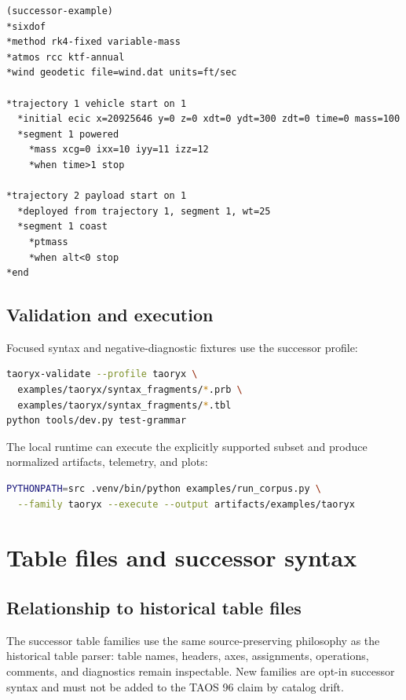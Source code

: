 \documentclass[11pt,twoside,openany]{book}
\begin{document}
\begin{lstlisting}
(successor-example)
*sixdof
*method rk4-fixed variable-mass
*atmos rcc ktf-annual
*wind geodetic file=wind.dat units=ft/sec

*trajectory 1 vehicle start on 1
  *initial ecic x=20925646 y=0 z=0 xdt=0 ydt=300 zdt=0 time=0 mass=100
  *segment 1 powered
    *mass xcg=0 ixx=10 iyy=11 izz=12
    *when time>1 stop

*trajectory 2 payload start on 1
  *deployed from trajectory 1, segment 1, wt=25
  *segment 1 coast
    *ptmass
    *when alt<0 stop
*end
\end{lstlisting}

\section{Validation and execution}

Focused syntax and negative-diagnostic fixtures use the successor profile:

\begin{lstlisting}[language=bash]
taoryx-validate --profile taoryx \
  examples/taoryx/syntax_fragments/*.prb \
  examples/taoryx/syntax_fragments/*.tbl
python tools/dev.py test-grammar
\end{lstlisting}

The local runtime can execute the explicitly supported subset and produce
normalized artifacts, telemetry, and plots:

\begin{lstlisting}[language=bash]
PYTHONPATH=src .venv/bin/python examples/run_corpus.py \
  --family taoryx --execute --output artifacts/examples/taoryx
\end{lstlisting}

\chapter{Table files and successor syntax}
\label{chap:successor-tables}

\section{Relationship to historical table files}

The successor table families use the same source-preserving philosophy as the
historical table parser: table names, headers, axes, assignments, operations,
comments, and diagnostics remain inspectable. New families are opt-in
successor syntax and must not be added to the TAOS 96 claim by catalog drift.
\end{document}
